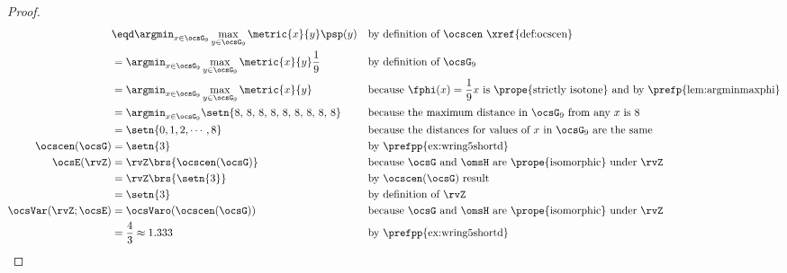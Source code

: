\begin{tabstr}{0.75}
\begin{proof}
\begin{align*}
    &\eqd \argmin_{x\in\ocsG_9}\max_{y\in\ocsG_9}\metric{x}{y}\psp(y)
    &&\text{by definition of $\ocscen$ \xref{def:ocscen}}
  \\&= \argmin_{x\in\ocsG_9}\max_{y\in\ocsG_9}\metric{x}{y}\frac{1}{9}
    &&\text{by definition of $\ocsG_9$}
  \\&= \argmin_{x\in\ocsG_9}\max_{y\in\ocsG_9}\metric{x}{y}
    && \text{because $\fphi(x)=\frac{1}{9}x$ is \prope{strictly isotone} and by \prefp{lem:argminmaxphi}}
  \\&= \argmin_{x\in\ocsG_9}\setn{8,\,8,\,8,\,8,\,8,\,8,\,8,\,8,\,8}
    && \text{because the maximum distance in $\ocsG_9$ from any $x$ is $8$}
  \\&= \setn{0,1,2,\cdots,8}
    && \text{because the distances for values of $x$ in $\ocsG_9$ are the same}
  \\
  \ocscen(\ocsG)
    &= \setn{3}
    && \text{by \prefpp{ex:wring5shortd}}
  \\
  \ocsE(\rvZ)
    &= \rvZ\brs{\ocscen(\ocsG)}
    && \text{because $\ocsG$ and $\omsH$ are \prope{isomorphic} under $\rvZ$}
  \\&= \rvZ\brs{\setn{3}}
    && \text{by $\ocscen(\ocsG)$ result}
  \\&= \setn{3}
    && \text{by definition of $\rvZ$}
  \\
  \ocsVar(\rvZ;\ocsE)
    &= \ocsVaro(\ocscen(\ocsG))
    && \text{because $\ocsG$ and $\omsH$ are \prope{isomorphic} under $\rvZ$}
  \\&= \frac{4}{3} \approx 1.333
    && \text{by \prefpp{ex:wring5shortd}}
\end{align*}
\end{proof}



\end{tabstr}
